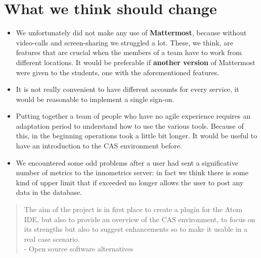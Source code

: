 \documentclass[a4paper,10pt]{report}
\begin{document}
\section{What we think should change} %
\begin{itemize}
	\item We unfortunately did not make any use of \textbf{Mattermost}, because without video-calls and screen-sharing we struggled a lot. These, we think, are features that are crucial when the members of a team have to work from different locations. It would be preferable if \textbf{another version} of Mattermost were given to the students, one with the aforementioned features.
	\item It is not really convenient to have different accounts for every service, it would be reasonable to implement a single sign-on.
	\item Putting together a team of people who have no agile experience requires an adaptation period to understand how to use the various tools. Because of this, in the beginning operations took a little bit longer. It would be useful to have an introduction to the CAS environment before.
	\item We encountered some odd problems after a user had sent a significative number of metrics to the innometrics server: in fact we think there is some kind of upper limit that if exceeded no longer allows the user to post any data in the database.

\end{itemize}










\begin{abstract}
	The aim of the project is in first place to create a plugin for the Atom IDE, but also to provide an overview of the CAS environment, to focus on its strengths but also to suggest enhancements so to make it usable in a real case scenario.\\
	- Open source software alternatives
	
	
\end{abstract}
\end{document}
